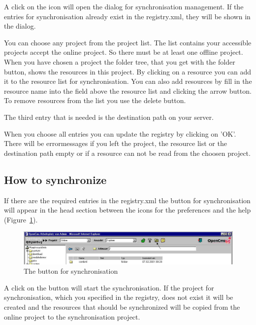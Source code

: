 A click on the icon will open the dialog for synchronisation
management. If the entries for synchronisation already exist in
the {\dir registry.xml}, they will be shown in the dialog.

You can choose any project from the project list. The list
contains your accessible projects accept the online project. So
there must be at least one offline project. When you have chosen a
project the folder tree, that you get with the folder button,
shows the resources in this project. By clicking on a resource you
can add it to the resource list for synchronisation. You can also
add resources by fill in the resource name into the field above
the resource list and clicking the arrow button. To remove
resources from the list you use the delete button.

The third entry that is needed is the destination path on your
server.

When you choose all entries you can update the registry by
clicking on 'OK'. There will be errormessages if you left the
project, the resource list or the destination path empty or if a
resource can not be read from the choosen project.

\subsection{How to synchronize}

If there are the required entries in the registry.xml the button
for synchronisation will appear in the head section between the
icons for the preferences and the help (Figure~\ref{syncicon}).

\begin{figure}[hbt]
\begin{center}
\includegraphics[width=\sgw]
                   {pics/synchronize/syncico}
\caption[The button for synchronisation]
           {The button for synchronisation}
\label{syncicon}
\end{center}
\end{figure}

A click on the button will start the synchronisation. If the project for synchronisation, which you specified in the registry, does not exist it will be created and the resources that should be synchronized will be copied from the online project to the synchronisation project.

